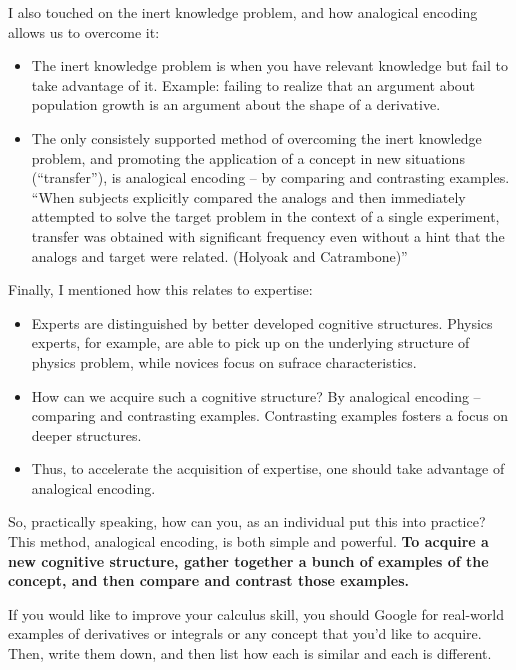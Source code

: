 I also touched on the inert knowledge problem, and how analogical
encoding allows us to overcome it:

\begin{itemize}
\itemsep1pt\parskip0pt
\item
  The inert knowledge problem is when you have relevant knowledge but
  fail to take advantage of it. Example: failing to realize that an
  argument about population growth is an argument about the shape of a
  derivative.
\item
  The only consistely supported method of overcoming the inert knowledge
  problem, and promoting the application of a concept in new situations
  (``transfer''), is analogical encoding -- by comparing and contrasting
  examples. ``When subjects explicitly compared the analogs and then
  immediately attempted to solve the target problem in the context of a
  single experiment, transfer was obtained with significant frequency
  even without a hint that the analogs and target were related. (Holyoak
  and Catrambone)''
\end{itemize}

Finally, I mentioned how this relates to expertise:

\begin{itemize}
\itemsep1pt\parskip0pt
\item
  Experts are distinguished by better developed cognitive structures.
  Physics experts, for example, are able to pick up on the underlying
  structure of physics problem, while novices focus on sufrace
  characteristics.
\item
  How can we acquire such a cognitive structure? By analogical encoding
  -- comparing and contrasting examples. Contrasting examples fosters a
  focus on deeper structures.
\item
  Thus, to accelerate the acquisition of expertise, one should take
  advantage of analogical encoding.
\end{itemize}

So, practically speaking, how can you, as an individual put this into
practice? This method, analogical encoding, is both simple and powerful.
\textbf{To acquire a new cognitive structure, gather together a bunch of
examples of the concept, and then compare and contrast those examples.}

If you would like to improve your calculus skill, you should Google for
real-world examples of derivatives or integrals or any concept that
you'd like to acquire. Then, write them down, and then list how each is
similar and each is different.

